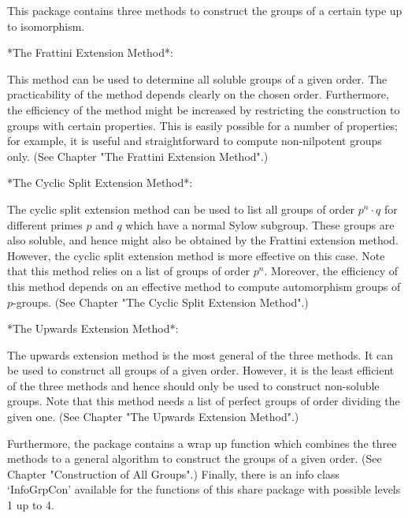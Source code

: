 


This package contains three methods to construct the groups of a 
certain type up to isomorphism. 


*The Frattini Extension Method*:

This method can be used to determine all soluble groups of a given 
order. The practicability of the method depends clearly on the 
chosen order. Furthermore, the efficiency of the method might be
increased by restricting the construction to groups with certain 
properties. This is easily possible for a number of properties;
for example, it is useful and straightforward to compute non-nilpotent
groups only. 
(See Chapter "The Frattini Extension Method".)


*The Cyclic Split Extension Method*:

The cyclic split extension method can be used to list all groups of 
order $p^n \cdot q$ for different primes $p$ and $q$ which have a 
normal Sylow subgroup. These groups are also soluble, and hence might
also be obtained by the Frattini extension method. However, the cyclic 
split extension method is more effective on this case. Note that this
method relies on a list of groups of order $p^n$. Moreover, the 
efficiency of this method depends on an effective method to compute 
automorphism groups of $p$-groups. (See Chapter "The Cyclic Split Extension 
Method".)


*The Upwards Extension Method*:

The upwards extension method is the most general of the three methods.
It can be used to construct all groups of a given order.  However, it 
is the least efficient of the three methods and hence should only be
used to construct non-soluble groups. Note that this method needs
a list of perfect groups of order dividing the given one. 
(See Chapter "The Upwards Extension Method".)


Furthermore, the package contains a wrap up function which combines
the three methods to a general algorithm to construct the groups of
a given order. (See Chapter "Construction of All Groups".) Finally,
there is an info class `InfoGrpCon' available for the functions of
this share package with possible levels 1 up to 4.





